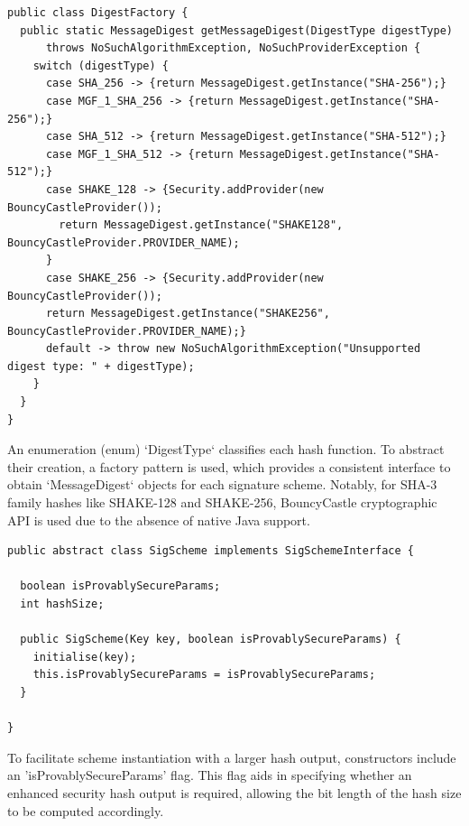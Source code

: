 \documentclass[]{final_report}
\theoremstyle{definition}
\begin{document}
 \begin{lstlisting}[caption=Retrieval of Message Digest Instances]
public class DigestFactory {
  public static MessageDigest getMessageDigest(DigestType digestType)
      throws NoSuchAlgorithmException, NoSuchProviderException {
    switch (digestType) {
      case SHA_256 -> {return MessageDigest.getInstance("SHA-256");}
      case MGF_1_SHA_256 -> {return MessageDigest.getInstance("SHA-256");}
      case SHA_512 -> {return MessageDigest.getInstance("SHA-512");}
      case MGF_1_SHA_512 -> {return MessageDigest.getInstance("SHA-512");}
      case SHAKE_128 -> {Security.addProvider(new BouncyCastleProvider());
        return MessageDigest.getInstance("SHAKE128", BouncyCastleProvider.PROVIDER_NAME);
      }
      case SHAKE_256 -> {Security.addProvider(new BouncyCastleProvider());
      return MessageDigest.getInstance("SHAKE256", BouncyCastleProvider.PROVIDER_NAME);}
      default -> throw new NoSuchAlgorithmException("Unsupported digest type: " + digestType);
    }
  }
}
 \end{lstlisting}
An enumeration (enum) `DigestType` classifies each hash function. To abstract their creation, a factory pattern is used, which provides a consistent interface to obtain `MessageDigest` objects for each signature scheme. Notably, for SHA-3 family hashes like SHAKE-128 and SHAKE-256, BouncyCastle cryptographic API is used due to the absence of native Java support.

\begin{lstlisting}[caption=Adaptation of Signature Scheme initialisation for specification of provably secure hash output ]
public abstract class SigScheme implements SigSchemeInterface {

  boolean isProvablySecureParams;
  int hashSize;
  
  public SigScheme(Key key, boolean isProvablySecureParams) {
    initialise(key);
    this.isProvablySecureParams = isProvablySecureParams;
  }
  
}
 \end{lstlisting}
To facilitate scheme instantiation with a larger hash output, constructors include an 'isProvablySecureParams' flag. This flag aids in specifying whether an enhanced security hash output is required, allowing the bit length of the hash size to be computed accordingly.
\end{document}

